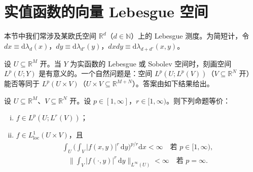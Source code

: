 \documentclass[../../main.tex]{subfiles}%
\begin{document}
\section{实值函数的向量 Lebesgue 空间}\label{section:ch04-实值向量Lp}

本节中我们常涉及某欧氏空间 $\mathbb{R}^d$（$d\in\mathbb{N}$）上的 Lebesgue 测度。为简短计，令 $dx\equiv\mathrm{d}\lambda_d(x)$，$dy\equiv\mathrm{d}\lambda_{d'}(y)$，$dxdy\equiv\mathrm{d}\lambda_{d+d'}(x,y)$。

设 $U\subseteq\mathbb{R}^M$ 开。当 $Y$ 为实函数的 Lebesgue 或 Sobolev 空间时，刻画空间 $L^p(U;Y)$ 是有意义的。一个自然问题是：空间 $L^p(U;L^p(V))$（$V\subseteq\mathbb{R}^N$ 开）能否等同于 $L^p(U\times V)$（$U\times V\subseteq\mathbb{R}^{M+N}$）。答案由如下结果给出。

\begin{proposition}\label{proposition:ch04-LpULpV}
设 $U\subseteq\mathbb{R}^M$、$V\subseteq\mathbb{R}^N$ 开。设 $p\in[1,\infty]$，$r\in[1,\infty)$。则下列命题等价：
\begin{enumerate}[(i)]
\item\label{item:ch04-LpULpV-i} $f\in L^p(U;L^r(V))$；
\item\label{item:ch04-LpULpV-ii} $f\in L^1_{\mathrm{loc}}(U\times V)$，且
\begin{align}
\int_U\Big(\int_V|f(x,y)|^r\,\mathrm{d}y\Big)^{p/r}\mathrm{d}x<\infty\quad\text{若 }p\in[1,\infty), \label{align:ch04-4.118a}
\end{align}
\begin{align}
\Big\|\int_V|f(\cdot,y)|^r\,\mathrm{d}y\Big\|_{L^\infty(U)}<\infty\quad\text{若 }p=\infty. \label{align:ch04-4.118b}
\end{align}
\end{enumerate}
\end{proposition}
\end{document}
